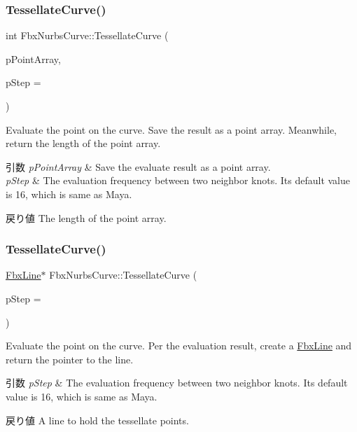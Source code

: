 \subsubsection{\texorpdfstring{Tessellate\+Curve()}{TessellateCurve()}\hspace{0.1cm}{\footnotesize\ttfamily [1/2]}}
{\footnotesize\ttfamily int Fbx\+Nurbs\+Curve\+::\+Tessellate\+Curve (\begin{DoxyParamCaption}\item[{\hyperlink{class_fbx_array}{Fbx\+Array}$<$ \hyperlink{class_fbx_vector4}{Fbx\+Vector4} $>$ \&}]{p\+Point\+Array,  }\item[{int}]{p\+Step = {} }\end{DoxyParamCaption})}

Evaluate the point on the curve. Save the result as a point array. Meanwhile, return the length of the point array. 
\begin{DoxyParams}{引数}
{\em p\+Point\+Array} & Save the evaluate result as a point array. \\
\hline
{\em p\+Step} & The evaluation frequency between two neighbor knots. Its default value is 16, which is same as Maya. \\
\hline
\end{DoxyParams}
\begin{DoxyReturn}{戻り値}
The length of the point array. 
\end{DoxyReturn}
\mbox{\label{class_fbx_nurbs_curve_a535cb7925acf214dee68598777067fd7}} 
\subsubsection{\texorpdfstring{Tessellate\+Curve()}{TessellateCurve()}\hspace{0.1cm}{\footnotesize\ttfamily [2/2]}}
{\footnotesize\ttfamily \hyperlink{class_fbx_line}{Fbx\+Line}$\ast$ Fbx\+Nurbs\+Curve\+::\+Tessellate\+Curve (\begin{DoxyParamCaption}\item[{int}]{p\+Step = {} }\end{DoxyParamCaption})}

Evaluate the point on the curve. Per the evaluation result, create a \hyperlink{class_fbx_line}{Fbx\+Line} and return the pointer to the line. 
\begin{DoxyParams}{引数}
{\em p\+Step} & The evaluation frequency between two neighbor knots. Its default value is 16, which is same as Maya. \\
\hline
\end{DoxyParams}
\begin{DoxyReturn}{戻り値}
A line to hold the tessellate points. 
\end{DoxyReturn}


